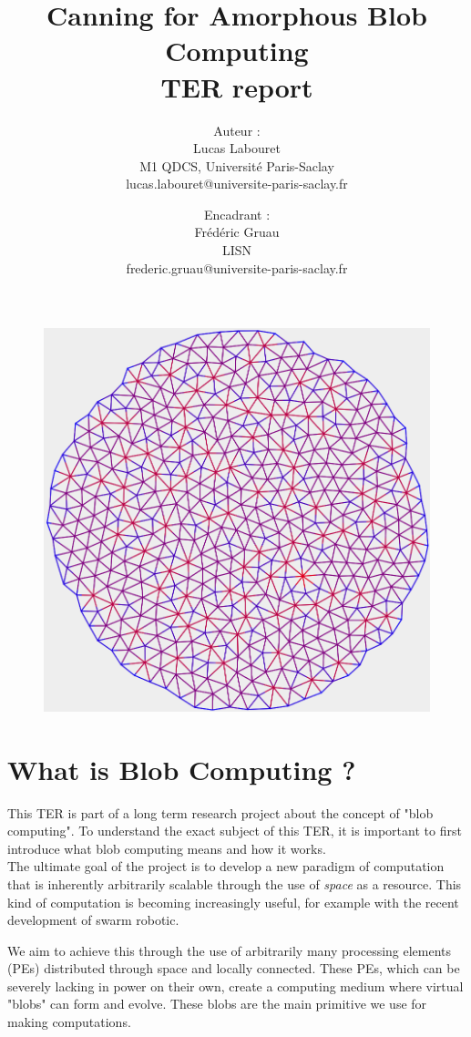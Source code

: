 \documentclass{article}
\title{
	Canning for Amorphous Blob Computing\\
	\small TER report
}
\author{
    Auteur :\\
    Lucas Labouret\\
    M1 QDCS, Université Paris-Saclay\\
    \small lucas.labouret@universite-paris-saclay.fr
    \and
    Encadrant :\\
    Frédéric Gruau\\
    LISN\\
    \small frederic.gruau@universite-paris-saclay.fr
}
\date{}
\begin{document}
 
\maketitle

\begin{figure}[H]
	\centering\includegraphics[width=0.9\linewidth]{assets/Circle500.png}
\end{figure}

\newpage
\tableofcontents
\newpage

\renewcommand{\thesection}{\Alph{section}}

\section{What is Blob Computing ?}

This TER is part of a long term research project about the concept of "blob computing"\supercite{blob_computing1}. To understand the exact subject of this TER, it is important to first introduce what blob computing means and how it works.\\

The ultimate goal of the project is to develop a new paradigm of computation that is inherently arbitrarily scalable through the use of \textit{space} as a resource. This kind of computation is becoming increasingly useful, for example with the recent development of swarm robotic\supercite{swarm_robotic}.

We aim to achieve this through the use of arbitrarily many processing elements (PEs) distributed through space and locally connected. These PEs, which can be severely lacking in power on their own, create a computing medium where virtual "blobs" can form and evolve. These blobs are the main primitive we use for making computations.
\end{document}
